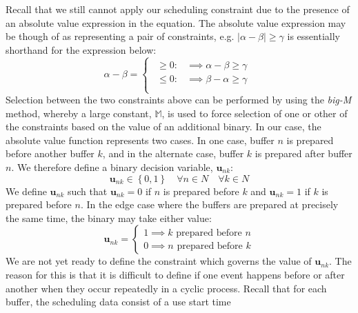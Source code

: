 Recall that we still cannot apply our scheduling constraint due to the presence
of an absolute value expression in the equation.
The absolute value expression may be though of as representing a pair of
constraints, e.g. $ \lvert \alpha - \beta \rvert \ge \gamma $ is essentially 
shorthand for the expression below:
\begin{equation}
    \alpha - \beta = 
    \begin{cases}
        \begin{alignedat}{2}
            \ge 0: &\implies \alpha - \beta \ge \gamma\\
            \le 0: &\implies \beta - \alpha \ge \gamma\\
        \end{alignedat}
    \end{cases}
\end{equation}
Selection between the two constraints above can be performed by using the 
\emph{big-M} method, whereby a large constant, $ \mathbb{M} $, is used to force
selection of one or other of the constraints
based on the value of an additional binary.
In our case, the absolute value function represents two cases.
In one case, buffer $n$ is prepared before another buffer $k$, and in the
alternate case, buffer $k$ is prepared after buffer $n$.
We therefore define a binary decision variable, $\boldsymbol{u}_{nk}$:
\begin{equation}
    \boldsymbol{u}_{nk} \in \left\{ 0, 1 \right\} \quad \forall n \in N \quad
    \forall k \in N
    \label{eq.u}
\end{equation}
We define $\boldsymbol{u}_{nk}$ such that $ \boldsymbol{u}_{nk} = 0 $ if $n$ is
prepared before $k$ and $ \boldsymbol{u}_{nk} = 1 $ if $k$ is prepared before
$n$.
In the edge case where the buffers are prepared at precisely the same time,
the binary may take either value:
\begin{equation}
    \boldsymbol{u}_{nk} =
    \begin{cases}
        1 \implies k \text{ prepared before } n\\
        0 \implies n \text{ prepared before } k
    \end{cases}
\end{equation}
We are not yet ready to define the constraint which governs the value of
$\boldsymbol{u}_{nk}$.
The reason for this is that it is difficult to define if one event happens
before or after another when they occur repeatedly in a cyclic process.
Recall that for each buffer, the scheduling data consist of a use start time
